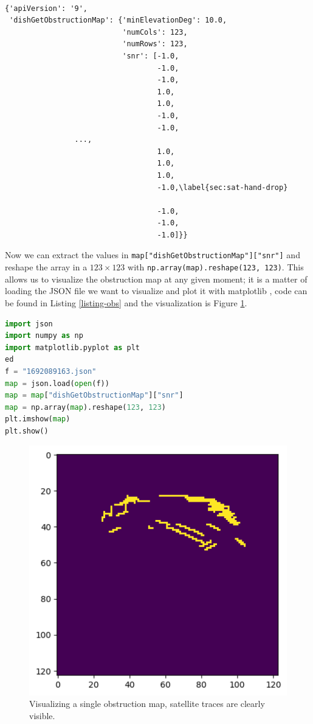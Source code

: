 \documentclass[IN,11pt,twoside,openright,idp,english]{tumthesis}
\begin{document}
\begin{lstlisting}[caption={data from the \texttt{dish\_get\_obstruction\_map} function},captionpos=b]

{'apiVersion': '9',
 'dishGetObstructionMap': {'minElevationDeg': 10.0,
                           'numCols': 123,
                           'numRows': 123,
                           'snr': [-1.0,
                                   -1.0,
                                   -1.0,
                                   1.0,
                                   1.0,
                                   -1.0,
                                   -1.0,
                ...,
                                   1.0,
                                   1.0,
                                   1.0,
                                   -1.0,\label{sec:sat-hand-drop}

                                   -1.0,
                                   -1.0,
                                   -1.0]}}  
\end{lstlisting}

Now we can extract the values in \texttt{map["dishGetObstructionMap"]["snr"]} and reshape the array in a $123\times123$ with \texttt{np.array(map).reshape(123, 123)}. This allows us to visualize the obstruction map at any given moment; it is a matter of loading the JSON file we want to visualize and plot it with matplotlib \cite{Hunter:2007}, code can be found in Listing \ref{listing-obs} and the visualization is Figure \ref{fig:vis-single-map}.

\begin{lstlisting}[language=python,caption={visualizing a single obstruction map},captionpos=b,label=listing-obs]
import json
import numpy as np
import matplotlib.pyplot as plt
ed
f = "1692089163.json"
map = json.load(open(f))
map = map["dishGetObstructionMap"]["snr"]
map = np.array(map).reshape(123, 123)
plt.imshow(map)
plt.show()
\end{lstlisting}

\begin{figure}
    \centering
    \includegraphics[width=0.5\columnwidth]{img/single_map.png}
    \caption{Visualizing a single obstruction map, satellite traces are clearly visible.}
    \label{fig:vis-single-map}
\end{figure}
\end{document}

